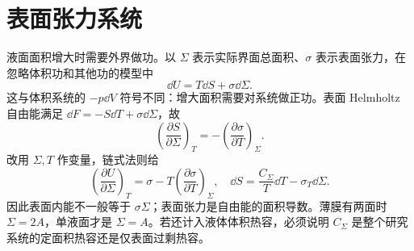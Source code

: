 \section{表面张力系统}
\label{th:surface}
液面面积增大时需要外界做功。以 $\Sigma$ 表示实际界面总面积、$\sigma$ 表示表面张力，在忽略体积功和其他功的模型中
\begin{equation}\label{eq:surfacefund}
 \dd U=T\dd S+\sigma\dd\Sigma.
\end{equation}
这与体积系统的 $-p\dd V$ 符号不同：增大面积需要对系统做正功。表面 Helmholtz 自由能满足 $\dd F=-S\dd T+\sigma\dd\Sigma$，故
\begin{equation}\label{eq:surfacemaxwell}
 \left(\frac{\partial S}{\partial\Sigma}\right)_T
 =-\left(\frac{\partial\sigma}{\partial T}\right)_\Sigma.
\end{equation}
改用 $\Sigma,T$ 作变量，链式法则给
\begin{equation}\label{eq:surfaceenergy}
 \left(\frac{\partial U}{\partial\Sigma}\right)_T
 =\sigma-T\left(\frac{\partial\sigma}{\partial T}\right)_\Sigma,
 \quad
 \dd S=\frac{C_\Sigma}{T}\dd T-\sigma_T\dd\Sigma.
\end{equation}
因此表面内能不一般等于 $\sigma\Sigma$；表面张力是自由能的面积导数。薄膜有两面时 $\Sigma=2A$，单液面才是 $\Sigma=A$。若还计入液体体积热容，必须说明 $C_\Sigma$ 是整个研究系统的定面积热容还是仅表面过剩热容。

